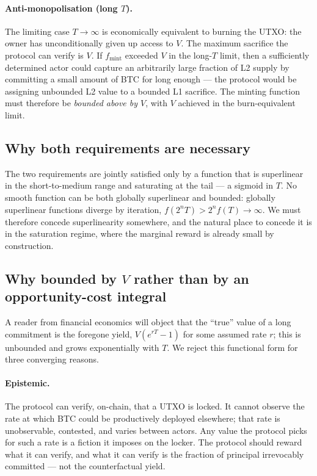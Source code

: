 \documentclass[11pt,a4paper]{article}
\newcommand{\fmint}{f_{\mathrm{mint}}}
\begin{document}
\paragraph{Anti-monopolisation (long $T$).} The limiting case $T \to \infty$ is economically equivalent to burning the UTXO: the owner has unconditionally given up access to $V$. The maximum sacrifice the protocol can verify is $V$. If $\fmint$ exceeded $V$ in the long-$T$ limit, then a sufficiently determined actor could capture an arbitrarily large fraction of L2 supply by committing a small amount of BTC for long enough --- the protocol would be assigning unbounded L2 value to a bounded L1 sacrifice. The minting function must therefore be \emph{bounded above by $V$}, with $V$ achieved in the burn-equivalent limit.

\subsection{Why both requirements are necessary}

The two requirements are jointly satisfied only by a function that is superlinear in the short-to-medium range and saturating at the tail --- a sigmoid in $T$. No smooth function can be both globally superlinear and bounded: globally superlinear functions diverge by iteration, $f(2^n T) > 2^n f(T) \to \infty$. We must therefore concede superlinearity somewhere, and the natural place to concede it is in the saturation regime, where the marginal reward is already small by construction.

\subsection{Why bounded by $V$ rather than by an opportunity-cost integral}

A reader from financial economics will object that the ``true'' value of a long commitment is the foregone yield, $V(e^{rT}-1)$ for some assumed rate $r$; this is unbounded and grows exponentially with $T$. We reject this functional form for three converging reasons.

\paragraph{Epistemic.} The protocol can verify, on-chain, that a UTXO is locked. It cannot observe the rate at which BTC could be productively deployed elsewhere; that rate is unobservable, contested, and varies between actors. Any value the protocol picks for such a rate is a fiction it imposes on the locker. The protocol should reward what it can verify, and what it can verify is the fraction of principal irrevocably committed --- not the counterfactual yield.
\end{document}
